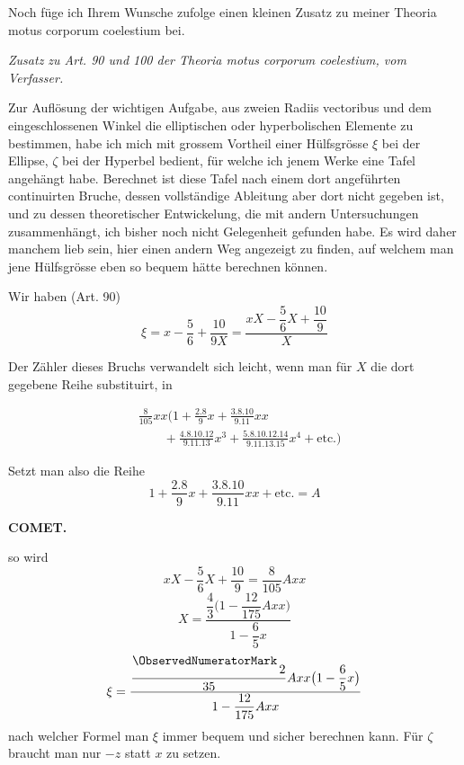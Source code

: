 \par\indent Noch füge ich Ihrem Wunsche zufolge einen kleinen Zusatz zu meiner Theoria motus corporum coelestium bei.
\begin{center}\emph{Zusatz zu Art. 90 und 100 der Theoria motus corporum coelestium, vom Verfasser.}\end{center}
\par\indent Zur Auflösung der wichtigen Aufgabe, aus zweien Radiis vectoribus und dem eingeschlossenen Winkel die elliptischen oder hyperbolischen Elemente zu bestimmen, habe ich mich mit grossem Vortheil einer Hülfsgrösse $\xi$ bei der Ellipse, $\zeta$ bei der Hyperbel bedient, für welche ich jenem Werke eine Tafel angehängt habe. Berechnet ist diese Tafel nach einem dort angeführten continuirten Bruche, dessen vollständige Ableitung aber dort nicht gegeben ist, und zu dessen theoretischer Entwickelung, die mit andern Untersuchungen zusammenhängt, ich bisher noch nicht Gelegenheit gefunden habe. Es wird daher manchem lieb sein, hier einen andern Weg angezeigt zu finden, auf welchem man jene Hülfsgrösse eben so bequem hätte berechnen können.

\par\indent Wir haben (Art. 90)
\[
\xi=x-\frac{5}{6}+\frac{10}{9X}=\frac{xX-\dfrac{5}{6}X+\dfrac{10}{9}}{X}
\]
\par\indent Der Zähler dieses Bruchs verwandelt sich leicht, wenn man für $X$ die dort gegebene Reihe substituirt, in

\[
\begin{aligned}
&\frac{8}{105}xx\bigl(1+\frac{2\mathord{.}8}{9}x+\frac{3\mathord{.}8\mathord{.}10}{9\mathord{.}11}xx\\
&\qquad+\frac{4\mathord{.}8\mathord{.}10\mathord{.}12}{9\mathord{.}11\mathord{.}13}x^3+\frac{5\mathord{.}8\mathord{.}10\mathord{.}12\mathord{.}14}{9\mathord{.}11\mathord{.}13\mathord{.}15}x^4+\text{etc.}\bigr)
\end{aligned}
\]
\par\indent Setzt man also die Reihe
\[
1+\frac{2\mathord{.}8}{9}x+\frac{3\mathord{.}8\mathord{.}10}{9\mathord{.}11}xx+\text{etc.}=A
\]
\clearpage
\thispagestyle{empty}
\noindent{}%
\makebox[12mm][l]{}%
\parbox[t]{\dimexpr\linewidth-24mm\relax}{\centering\footnotesize\bfseries COMET.\par}%
\par\nobreak\medskip
\noindent so wird
\[
xX-\frac{5}{6}X+\frac{10}{9}=\frac{8}{105}Axx
\]
\[
X=\frac{\dfrac{4}{3}\bigl(1-\dfrac{12}{175}Axx\bigr)}{1-\dfrac{6}{5}x}
\]
\[
\xi=\frac{\dfrac{\mathord{\raisebox{7bp}{\ObservedNumeratorMark}\,}2}{35}Axx\bigl(1-\dfrac{6}{5}x\bigr)}{1-\dfrac{12}{175}Axx}
\]
\noindent nach welcher Formel man $\xi$ immer bequem und sicher berechnen kann. Für $\zeta$ braucht man nur $-z$ statt $x$ zu setzen.

